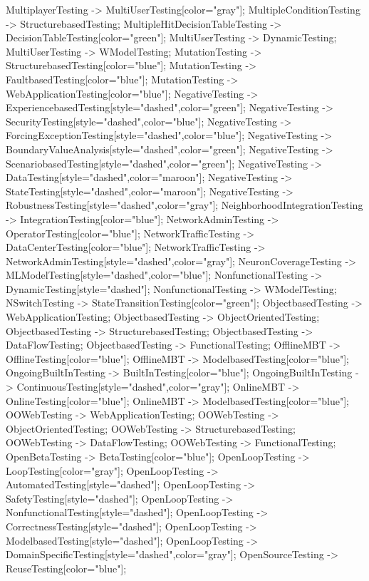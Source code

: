 \documentclass{article}
\begin{document}
{MultiplayerTesting -> MultiUserTesting[color="gray"];
MultipleConditionTesting -> StructurebasedTesting;
MultipleHitDecisionTableTesting -> DecisionTableTesting[color="green"];
MultiUserTesting -> DynamicTesting;
MultiUserTesting -> WModelTesting;
MutationTesting -> StructurebasedTesting[color="blue"];
MutationTesting -> FaultbasedTesting[color="blue"];
MutationTesting -> WebApplicationTesting[color="blue"];
NegativeTesting -> ExperiencebasedTesting[style="dashed",color="green"];
NegativeTesting -> SecurityTesting[style="dashed",color="blue"];
NegativeTesting -> ForcingExceptionTesting[style="dashed",color="blue"];
NegativeTesting -> BoundaryValueAnalysis[style="dashed",color="green"];
NegativeTesting -> ScenariobasedTesting[style="dashed",color="green"];
NegativeTesting -> DataTesting[style="dashed",color="maroon"];
NegativeTesting -> StateTesting[style="dashed",color="maroon"];
NegativeTesting -> RobustnessTesting[style="dashed",color="gray"];
NeighborhoodIntegrationTesting -> IntegrationTesting[color="blue"];
NetworkAdminTesting -> OperatorTesting[color="blue"];
NetworkTrafficTesting -> DataCenterTesting[color="blue"];
NetworkTrafficTesting -> NetworkAdminTesting[style="dashed",color="gray"];
NeuronCoverageTesting -> MLModelTesting[style="dashed",color="blue"];
NonfunctionalTesting -> DynamicTesting[style="dashed"];
NonfunctionalTesting -> WModelTesting;
NSwitchTesting -> StateTransitionTesting[color="green"];
ObjectbasedTesting -> WebApplicationTesting;
ObjectbasedTesting -> ObjectOrientedTesting;
ObjectbasedTesting -> StructurebasedTesting;
ObjectbasedTesting -> DataFlowTesting;
ObjectbasedTesting -> FunctionalTesting;
OfflineMBT -> OfflineTesting[color="blue"];
OfflineMBT -> ModelbasedTesting[color="blue"];
OngoingBuiltInTesting -> BuiltInTesting[color="blue"];
OngoingBuiltInTesting -> ContinuousTesting[style="dashed",color="gray"];
OnlineMBT -> OnlineTesting[color="blue"];
OnlineMBT -> ModelbasedTesting[color="blue"];
OOWebTesting -> WebApplicationTesting;
OOWebTesting -> ObjectOrientedTesting;
OOWebTesting -> StructurebasedTesting;
OOWebTesting -> DataFlowTesting;
OOWebTesting -> FunctionalTesting;
OpenBetaTesting -> BetaTesting[color="blue"];
OpenLoopTesting -> LoopTesting[color="gray"];
OpenLoopTesting -> AutomatedTesting[style="dashed"];
OpenLoopTesting -> SafetyTesting[style="dashed"];
OpenLoopTesting -> NonfunctionalTesting[style="dashed"];
OpenLoopTesting -> CorrectnessTesting[style="dashed"];
OpenLoopTesting -> ModelbasedTesting[style="dashed"];
OpenLoopTesting -> DomainSpecificTesting[style="dashed",color="gray"];
OpenSourceTesting -> ReuseTesting[color="blue"];
}
\end{document}
